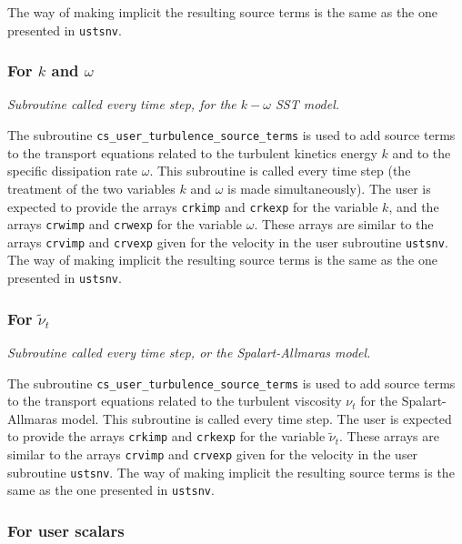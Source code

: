 {{{The way of making implicit the resulting source terms is the same as the
one presented in \texttt{ustsnv}.

\subsubsection{For $k$ and $\omega$}

\noindent
\textit{Subroutine called every time step, for the $k-\omega$ SST model.}

The subroutine \texttt{cs\_user\_turbulence\_source\_terms} is used to add source terms to the transport equations
related to the turbulent kinetics energy $k$ and to the specific
dissipation rate $\omega$. This subroutine is
called every time step (the treatment of the two
variables $k$ and $\omega$ is made simultaneously). The user is expected
to provide the arrays \texttt{crkimp} and \texttt{crkexp} for the variable
$k$, and the arrays \texttt{crwimp} and \texttt{crwexp} for the variable $\omega$.
These arrays are similar to the arrays \texttt{crvimp} and \texttt{crvexp}
given for the velocity in the user subroutine \texttt{ustsnv}. The way of
making implicit the resulting source terms is the same as the one presented in
\texttt{ustsnv}.

\subsubsection{For $\tilde{\nu}_t$}

\noindent
\textit{Subroutine called every time step, or the Spalart-Allmaras model.}

The subroutine \texttt{cs\_user\_turbulence\_source\_terms} is used to add source terms to the transport equations
related to the turbulent viscosity $\nu_t$ for the Spalart-Allmaras model.
This subroutine is called every time step. The user is expected
to provide the arrays \texttt{crkimp} and \texttt{crkexp} for the variable
$\tilde{\nu}_t$. These arrays are similar to the arrays \texttt{crvimp} and \texttt{crvexp}
given for the velocity in the user subroutine \texttt{ustsnv}. The way of
making implicit the resulting source terms is the same as the one presented in
\texttt{ustsnv}.

\subsubsection{For user scalars}

}}}

